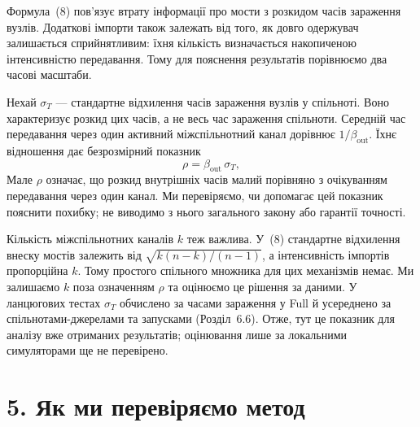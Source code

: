 \documentclass[11pt,a4paper]{article}
\newcommand{\Full}{\textnormal{Full}}
\begin{document}
Формула~(8) пов'язує втрату інформації про мости з розкидом часів зараження вузлів. Додаткові імпорти також залежать від того, як довго одержувач залишається сприйнятливим: їхня кількість визначається накопиченою інтенсивністю передавання. Тому для пояснення результатів порівнюємо два часові масштаби.
\par Нехай $\sigma_T$ --- стандартне відхилення часів зараження вузлів у спільноті. Воно характеризує розкид цих часів, а не весь час зараження спільноти. Середній час передавання через один активний міжспільнотний канал дорівнює $1/\beta_{\mathrm{out}}$. Їхнє відношення дає безрозмірний показник
\begin{equation*}\rho=\beta_{\mathrm{out}}\,\sigma_T,\tag{10}
\end{equation*}
Мале $\rho$ означає, що розкид внутрішніх часів малий порівняно з очікуванням передавання через один канал. Ми перевіряємо, чи допомагає цей показник пояснити похибку; не виводимо з нього загального закону або гарантії точності.
\par Кількість міжспільнотних каналів $k$ теж важлива. У~(8) стандартне відхилення внеску мостів залежить від $\sqrt{k(n-k)/(n-1)}$, а інтенсивність імпортів пропорційна $k$. Тому простого спільного множника для цих механізмів немає. Ми залишаємо $k$ поза означенням $\rho$ та оцінюємо це рішення за даними. У ланцюгових тестах $\sigma_T$ обчислено за часами зараження у \Full{} й усереднено за спільнотами-джерелами та запусками (Розділ~6.6). Отже, тут це показник для аналізу вже отриманих результатів; оцінювання лише за локальними симуляторами ще не перевірено.
\clearpage
\section*{5. Як ми перевіряємо метод}
\end{document}
